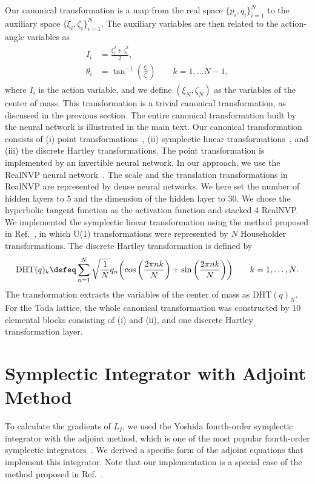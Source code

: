 Our canonical transformation is a map from the real space $\{p_i,q_i\}_{i=1}^{N}$ to the auxiliary space $\{\xi_i,\zeta_i\}_{i=1}^{N}$.
The auxiliary variables are then related to the action-angle variables as
\begin{align}
  \begin{split}
    I_i & = \frac{\xi_i^2 + \zeta_i^2}{2}, \\
    \theta_i & = \tan^{-1}\left(\frac{\xi_i}{\zeta_i}\right) \qquad k = 1, \ldots N-1,
  \end{split}
\end{align}
where $I_i$ is the action variable, and we define $(\xi_N,\zeta_N)$ as the variables of the center of mass.
This transformation is a trivial canonical transformation, as discussed in the previous section.
The entire canonical transformation built by the neural network is illustrated in the main text.
Our canonical transformation consists of (i) point transformations~\cite{Shuo-Hui-etal2020}, (ii) symplectic linear transformations~\cite{Bondesan-Lamacraft2019}, and (iii) the discrete Hartley transformations.
The point transformation is implemented by an invertible neural network. In our approach, we use the RealNVP neural network~\cite{RealNVP2017}.
The scale and the translation transformations in RealNVP are represented by dense neural networks.
We here set the number of hidden layers to $5$ and the dimension of the hidden layer to $30$.
We chose the hyperbolic tangent function as the activation function and stacked $4$ RealNVP.
We implemented the symplectic linear transformation using the method proposed in Ref.~, in which U(1) transformations were represented by $N$ Householder transformations.
The discrete Hartley transformation is defined by~\cite{Hartley1942,Bracewell1983}
\begin{align}
  \mathrm{DHT}(q)_k \defeq
        \sum_{n=1}^N \sqrt{\frac{1}{N}}q_n\biggl(\cos\left(\frac{2\pi nk}{N}\right) + \sin\left(\frac{2\pi nk}{N}\right)\biggr) \qquad k=1,\ldots,N.\label{eq:discrete_hartley_trans_in_chap4}
\end{align}
The transformation extracts the variables of the center of mass as $\mathrm{DHT}(q)_N$.
For the Toda lattice, the whole canonical transformation was constructed by $10$ elemental blocks consisting of (i) and (ii), and one discrete Hartley transformation layer.

\section{Symplectic Integrator with Adjoint Method}
To calculate the gradients of $L_I$, we used the Yoshida fourth-order symplectic integrator with the adjoint method, which is one of the most popular fourth-order symplectic integrators~\cite{Yoshida1990,Candy-Rozmus1991,Forest-Ruth1990,Neri1987}.
We derived a specific form of the adjoint equations that implement this integrator.
Note that our implementation is a special case of the method proposed in Ref.~.

